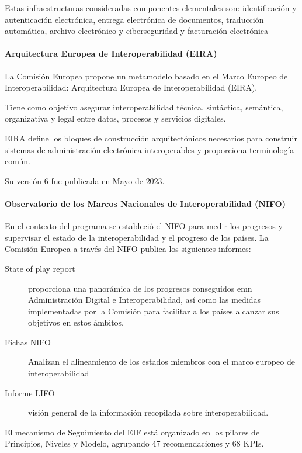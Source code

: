             Estas infraestructuras consideradas componentes elementales son: identificación y autenticación electrónica, entrega electrónica de documentos, traducción automática, archivo electrónico y ciberseguridad y facturación electrónica

        \paragraph{Arquitectura Europea de Interoperabilidad (EIRA)} %
            La Comisión Europea propone un metamodelo basado en el Marco Europeo de Interoperabilidad: Arquitectura Europea de Interoperabilidad (EIRA).

            Tiene como objetivo asegurar interoperabilidad técnica, sintáctica, semántica, organizativa y legal entre datos, procesos y servicios digitales.

            EIRA define los bloques de construcción arquitectónicos necesarios para construir sistemas de administración electrónica interoperables y proporciona terminología común.

            Su versión 6 fue publicada en Mayo de 2023.

        \paragraph{Observatorio de los Marcos Nacionales de Interoperabilidad (NIFO)} %
            En el contexto del programa \ISA se estableció el NIFO para medir los progresos y supervisar el estado de la interoperabilidad y el progreso de los países. La Comisión Europea a través del NIFO publica los siguientes informes:
            \begin{description}
                \item[State of play report] proporciona una panorámica de los progresos conseguidos emn Administración Digital e Interoperabilidad, así como las medidas implementadas por la Comisión para facilitar a los países alcanzar sus objetivos en estos ámbitos.
                \item[Fichas NIFO] Analizan el alineamiento de los estados miembros con el marco europeo de interoperabilidad
                \item[Informe LIFO] visión general de la información recopilada sobre interoperabilidad.
            \end{description}

            El mecanismo de Seguimiento del EIF está organizado en los pilares de Principios, Niveles y Modelo, agrupando 47 recomendaciones y 68 KPIs.

